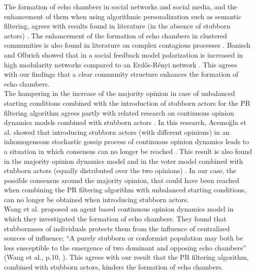 \documentclass[11 pt , letterpaper , twoside , openright]{book}
\begin{document}
\newline
The formation of echo chambers in social networks and social media, and the enhancement of them when using algorithmic personalization such as semantic filtering, agrees with results found in literature (in the absence of stubborn actors) \cite{Baumann2019}\cite{Cinelli2020}\cite{Nikolov2015}\cite{Sirbu2018}. The enhancement of the formation of echo chambers in clustered communities is also found in literature on complex contagious processes \cite{Becker2017}. Banisch and Olbrich showed that in a social feedback model polarization is increased in high modularity networks compared to an Erd\H{o}s-R\'{e}nyi network \cite{Banisch2018}. This agrees with our findings that a clear community structure enhances the formation of echo chambers.\\
\newline
The hampering in the increase of the majority opinion in case of unbalanced starting conditions combined with the introduction of stubborn actors for the PR filtering algorithm agrees partly with related research on continuous opinion dynamics models combined with stubborn actors \cite{Como2013}. In this research, Acemo\u{g}lu et al. showed that introducing stubborn actors (with different opinions) in an inhomogeneous stochastic gossip process of continuous opinion dynamics leads to a situation in which consensus can no longer be reached \cite{Como2013}. This result is also found in the majority opinion dynamics model and in the voter model combined with stubborn actors (equally distributed over the two opinions) \cite{Galam2007}\cite{Mobilia2007}\cite{Yildiz2013}. In our case, the possible consensus around the majority opinion, that could have been reached when combining the PR filtering algorithm with unbalanced starting conditions, can no longer be obtained when introducing stubborn actors.\\
\newline
Wang et al. \cite{Wang2020} proposed an agent based continuous opinion dynamics model in which they investigated the formation of echo chambers. They found that stubbornness of individuals protects them from the
influence of centralized sources of influence; ``A purely stubborn or conformist
population may both be less susceptible to the emergence of
two dominant and opposing echo chambers'' (Wang et al., p.10, \cite{Wang2020}). This agrees with our result that the PR filtering algorithm, combined with stubborn actors, hinders the formation of echo chambers.\\
\newline
\end{document}
